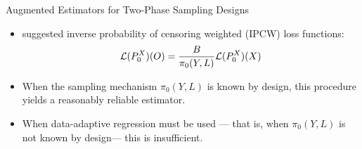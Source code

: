 \documentclass{beamer}
\begin{document}
\begin{frame}[c]{Augmented Estimators for Two-Phase Sampling Designs}

\begin{center}
\begin{itemize}
  \itemsep8pt
  \item \cite{rose2011targeted2sd} suggested inverse probability of censoring
    weighted (IPCW) loss functions:
    \begin{equation*}
      \mathcal{L}(P_0^X)(O) = \frac{B}{\pi_0(Y, L)}\mathcal{L}(P_0^X)(X)
    \end{equation*}
  \item When the sampling mechanism $\pi_0(Y,L)$ is known by design, this
    procedure yields a reasonably reliable estimator.
  \item When data-adaptive regression must be used --- that is, when
    $\pi_0(Y,L)$ is not known by design\footnotemark --- this is insufficient.
\end{itemize}
\end{center}

\note{
}


\end{frame}

\end{document}
